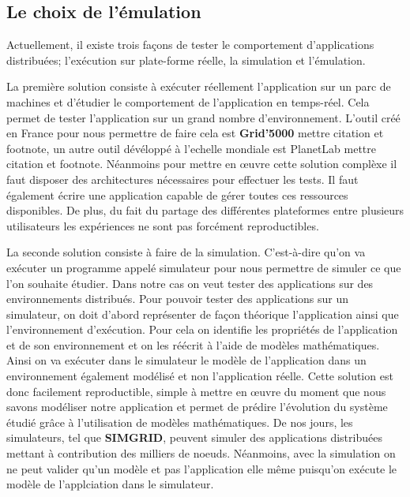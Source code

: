 \subsection{Le choix de l'émulation}

Actuellement, il existe trois façons de tester le comportement d'applications distribuées; l'exécution sur plate-forme réelle, la simulation et l'émulation. 

La première solution consiste à exécuter réellement l'application sur un parc de machines et d'étudier le comportement de l'application en temps-réel. Cela permet de tester l'application sur un grand nombre d'environnement. L'outil créé en France pour nous permettre de faire cela est \textbf{Grid'5000} {\color{red}mettre citation et footnote}, un autre outil dévéloppé à l'echelle mondiale est PlanetLab {\color{red}mettre citation et footnote}. Néanmoins pour mettre en \oe uvre cette solution complèxe il faut disposer des architectures nécessaires pour effectuer les tests. Il faut également écrire une application capable de gérer toutes ces ressources disponibles. De plus, du fait du partage des différentes plateformes entre plusieurs utilisateurs les expériences ne sont pas forcément reproductibles. 

La seconde solution consiste à faire de la simulation. C'est-à-dire qu'on va exécuter un programme appelé simulateur pour nous permettre de simuler ce que l'on souhaite étudier. Dans notre cas on veut tester des applications sur des environnements distribués. Pour pouvoir tester des applications sur un simulateur, on doit d'abord représenter de façon théorique l'application ainsi que l'environnement d'exécution. Pour cela on identifie les propriétés de l'application et de son environnement et on les réécrit à l'aide de modèles mathématiques. Ainsi on va exécuter dans le simulateur le modèle de l'application dans un environnement également modélisé et non l'application réelle. Cette solution est donc facilement reproductible, simple à mettre en \oe uvre du moment que nous savons modéliser notre application et permet de prédire l'évolution du système étudié grâce à l'utilisation de modèles mathématiques. De nos jours, les simulateurs, tel que  \textbf{SIMGRID}\cite{MARTIN:SimGrid}, peuvent simuler des applications distribuées mettant à contribution des milliers de noeuds. Néanmoins, avec la simulation on ne peut valider qu'un modèle et pas l'application elle même puisqu'on exécute le modèle de l'applciation dans le simulateur. 

